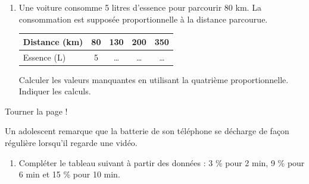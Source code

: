 \documentclass[a4paper]{book}
\begin{document}
{\begin{exercice}
\begin{enumerate}
            \vspace{0.5cm}
            
            \begin{enumerate}
                \item Trouver le coefficient de proportionnalité pour remplir la colonne du "1". \dotfill

                \medskip
                
                \item Utiliser des relations simples pour compléter les autres colonnes. Faire apparaître les opérations autour du tableau.
            \end{enumerate}

            \item Une voiture consomme 5 litres d'essence pour parcourir 80 km. La consommation est supposée proportionnelle à la distance parcourue.

            \vspace{0.5cm}
        
            \begin{center}
                \renewcommand{\arraystretch}{1.5}
                \begin{tabular}{|l|c|c|c|c|}
                \hline
                Distance (km) & 80 & 130 & 200 & 350 \\ \hline
                Essence (L) & 5 & \dots & \dots & \dots \\ \hline
                \end{tabular}
            \end{center}

            \vspace{1cm}
            
            Calculer les valeurs manquantes en utilisant la quatrième proportionnelle. Indiquer les calculs.

            \begin{ZoneReponse}{2cm}\end{ZoneReponse}
        \end{enumerate}
    \end{exercice}


\vfill\hfill Tourner la page !

    \begin{exercice}
        Un adolescent remarque que la batterie de son téléphone se décharge de façon régulière lorsqu'il regarde une vidéo.

        \begin{enumerate}
            \item Compléter le tableau suivant à partir des données : 3 \% pour 2 min, 9 \% pour 6 min et 15 \% pour 10 min.
            

\end{enumerate}
\end{exercice}}
\end{document}
